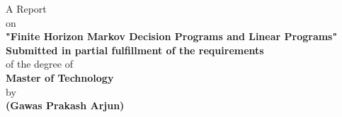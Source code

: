\begin{titlepage}
\begin{center}
	\vspace*{1cm}
	\Large
	A Report\\
	\vspace{0.5cm}
	\Large
	on\\
	\vspace{0.5cm}
	\Huge
	\textbf{"Finite Horizon Markov Decision Programs and Linear Programs"}\\
	\vspace{0.5cm}
	\vspace{1.5cm}
	\Large
	\textbf{Submitted in partial fulfillment of the requirements}\\
	\vspace{0.5cm}
	\Large
	of  the degree of\\
	\vspace{0.5cm}
	\Large
	\textbf{Master of Technology}\\
	\vspace{0.5cm}
	\Large
	by\\
	\vspace{0.2cm}
	\Large
	\textbf{(Gawas Prakash Arjun)}\\
	

\end{center}
\end{titlepage}
